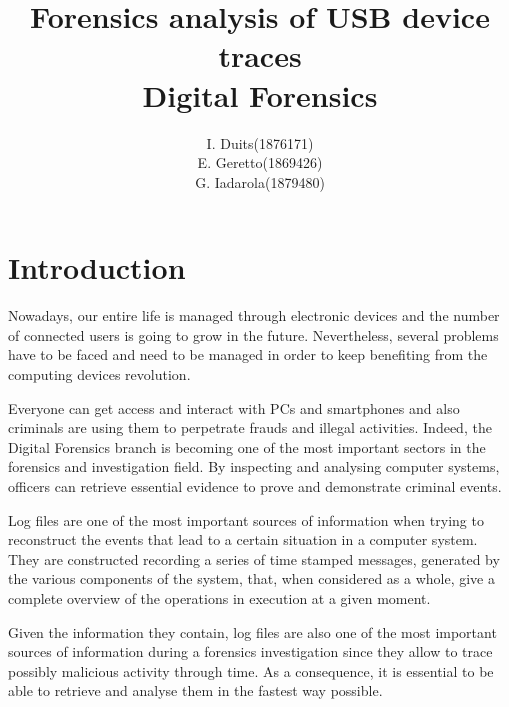 \documentclass[a4paper]{article}
\title{Forensics analysis of USB device traces\\
\large Digital Forensics}
\author{
\begin{tabular}{>{\raggedleft}m{5cm}m{5cm}}
I. Duits & (1876171) \\
E. Geretto & (1869426) \\
G. Iadarola & (1879480) \\
\end{tabular}
}
\begin{document}
\maketitle


\section{Introduction}
\label{sec:intro}
Nowadays, our entire life is managed through electronic devices and the number of
connected users is going to grow in the future. Nevertheless, several
problems have to be faced and need to be managed in order to keep benefiting
from the computing devices revolution.

Everyone can get access and interact with PCs and smartphones and also criminals
are using them to perpetrate frauds and illegal activities. Indeed, the Digital
Forensics branch is becoming one of the most important sectors in the forensics
and investigation field. By inspecting and analysing computer systems, officers
can retrieve essential evidence to prove and demonstrate criminal events.

Log files are one of the most important sources of information when trying to
reconstruct the events that lead to a certain situation in a computer system.
They are constructed recording a series of time stamped messages, generated by
the various components of the system, that, when considered as a whole, give a
complete overview of the operations in execution at a given moment.

Given the information they contain, log files are also one of the most important
sources of information during a forensics investigation since they allow to
trace possibly malicious activity through time. As a consequence, it is
essential to be able to retrieve and analyse them in the fastest way
possible.~\cite{finlayson1987log}
\end{document}
